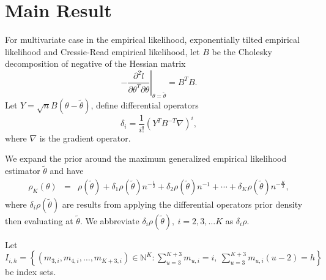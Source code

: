 \section{Main Result\label{sec:main-result}}

For multivariate case
in the empirical likelihood, exponentially tilted empirical likelihood and Cressie-Read empirical likelihood, let $B$ be the Cholesky decomposition of
negative of the Hessian matrix 
\[
-\left.\frac{\partial^{2}\hat{l}}{\partial\theta^{T}\partial\theta}\right|_{\theta=\tilde{\theta}}=B^{T}B.
\]
Let $Y=\sqrt{n}B\left(\theta-\tilde{\theta}\right)$, define differential
operators 
\[
\delta_{i}=\frac{1}{i!}\left(Y^{T}B^{-T}\nabla\right)^{i},
\]
where $\nabla$ is the gradient operator. 

We expand the prior around the maximum generalized empirical likelihood estimator $\tilde{\theta}$ and have
\begin{eqnarray*}
\rho_{K}\left(\theta\right) & = & \rho\left(\tilde{\theta}\right)+\delta_{1}\rho\left(\tilde{\theta}\right)n^{-\frac{1}{2}}+\delta_{2}\rho\left(\tilde{\theta}\right)n^{-1}+\cdots+\delta_{K}\rho\left(\tilde{\theta}\right)n^{-\frac{K}{2}},
\end{eqnarray*}
where $\delta_{i}\rho\left(\tilde{\theta}\right)$ are results from
applying the differential operators prior density then evaluating
at $\tilde{\theta}$. We abbreviate $\delta_{i}\rho\left(\tilde{\theta}\right),\: i=2,3,\ldots K$
as $\delta_{i}\rho$.

\begin{comment}
add multivariate case coefficients
\end{comment}



Let $I_{i,h}=\left\{ \left(m_{3,i},m_{4,i},\ldots,m_{K+3,i}\right)\in\mathbb{N}^{K}:\sum_{u=3}^{K+3}m_{u,i}=i,\:\sum_{u=3}^{K+3}m_{u,i}\left(u-2\right)=h\right\} $ be index sets.

